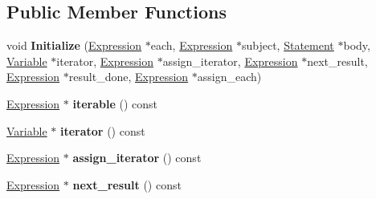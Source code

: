 \subsection*{Public Member Functions}
\begin{DoxyCompactItemize}
\item 
void {\bfseries Initialize} (\hyperlink{classv8_1_1internal_1_1_expression}{Expression} $\ast$each, \hyperlink{classv8_1_1internal_1_1_expression}{Expression} $\ast$subject, \hyperlink{classv8_1_1internal_1_1_statement}{Statement} $\ast$body, \hyperlink{classv8_1_1internal_1_1_variable}{Variable} $\ast$iterator, \hyperlink{classv8_1_1internal_1_1_expression}{Expression} $\ast$assign\+\_\+iterator, \hyperlink{classv8_1_1internal_1_1_expression}{Expression} $\ast$next\+\_\+result, \hyperlink{classv8_1_1internal_1_1_expression}{Expression} $\ast$result\+\_\+done, \hyperlink{classv8_1_1internal_1_1_expression}{Expression} $\ast$assign\+\_\+each)\hypertarget{classv8_1_1internal_1_1_for_of_statement_a2a188c5a9962f3af255b3f38a059e26c}{}\label{classv8_1_1internal_1_1_for_of_statement_a2a188c5a9962f3af255b3f38a059e26c}

\item 
\hyperlink{classv8_1_1internal_1_1_expression}{Expression} $\ast$ {\bfseries iterable} () const \hypertarget{classv8_1_1internal_1_1_for_of_statement_a0143b2864d57dc6140185cad91a4e839}{}\label{classv8_1_1internal_1_1_for_of_statement_a0143b2864d57dc6140185cad91a4e839}

\item 
\hyperlink{classv8_1_1internal_1_1_variable}{Variable} $\ast$ {\bfseries iterator} () const \hypertarget{classv8_1_1internal_1_1_for_of_statement_aaaab92101c3b9d73e15ff2a220c4c334}{}\label{classv8_1_1internal_1_1_for_of_statement_aaaab92101c3b9d73e15ff2a220c4c334}

\item 
\hyperlink{classv8_1_1internal_1_1_expression}{Expression} $\ast$ {\bfseries assign\+\_\+iterator} () const \hypertarget{classv8_1_1internal_1_1_for_of_statement_ad39b847cb8d2750f0944e11616604082}{}\label{classv8_1_1internal_1_1_for_of_statement_ad39b847cb8d2750f0944e11616604082}

\item 
\hyperlink{classv8_1_1internal_1_1_expression}{Expression} $\ast$ {\bfseries next\+\_\+result} () const \hypertarget{classv8_1_1internal_1_1_for_of_statement_acc0e9cd01c4b36d7df7246ed0e17eea3}{}\label{classv8_1_1internal_1_1_for_of_statement_acc0e9cd01c4b36d7df7246ed0e17eea3}


\end{DoxyCompactItemize}
